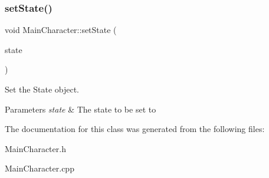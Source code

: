 \subsubsection{\texorpdfstring{setState()}{setState()}}
{\footnotesize\ttfamily void Main\+Character\+::set\+State (\begin{DoxyParamCaption}\item[{State\+Of\+Character}]{state }\end{DoxyParamCaption})}



Set the State object. 


\begin{DoxyParams}{Parameters}
{\em state} & The state to be set to \\
\hline
\end{DoxyParams}


The documentation for this class was generated from the following files\+:\begin{DoxyCompactItemize}
\item 
Main\+Character.\+h\item 
Main\+Character.\+cpp\end{DoxyCompactItemize}
